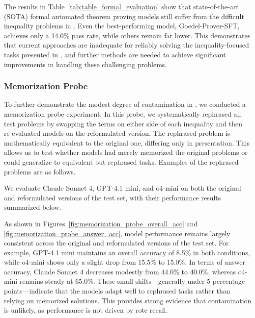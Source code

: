 

The results in Table~\ref{tab:table_formal_evaluation} show that state-of-the-art (SOTA) formal automated theorem proving models still suffer from the difficult inequality problems in \dataset. Even the best-performing model, Goedel-Prover-SFT, achieves only a 14.0\% pass rate, while others remain far lower. This demonstrates that current approaches are inadequate for reliably solving the inequality-focused tasks presented in \dataset, and further methods are needed to achieve significant improvements in handling these challenging problems. 

\subsubsection{Memorization Probe}
\label{app:memorization_probe}

To further demonstrate the modest degree of contamination in \dataset, we conducted a memorization probe experiment. In this probe, we systematically rephrased all test problems by swapping the terms on either side of each inequality and then re-evaluated models on the reformulated version. The rephrased problem is mathematically equivalent to the original one, differing only in presentation. This allows us to test whether models had merely memorized the original problems or could generalize to equivalent but rephrased tasks. Examples of the rephrased problems are as follows.




We evaluate Claude Sonnet 4, GPT-4.1 mini, and o4-mini on both the original and reformulated versions of the \dataset test set, with their performance results summarized below.

As shown in Figures~\ref{fig:memorization_probe_overall_acc} and \ref{fig:memorization_probe_answer_acc}, model performance remains largely consistent across the original and reformulated versions of the \dataset test set. For example, GPT-4.1 mini maintains an overall accuracy of 8.5\% in both conditions, while o4-mini shows only a slight drop from 15.5\% to 15.0\%. In terms of answer accuracy, Claude Sonnet 4 decreases modestly from 44.0\% to 40.0\%, whereas o4-mini remains steady at 65.0\%. These small shifts—generally under 5 percentage points—indicate that the models adapt well to rephrased tasks rather than relying on memorized solutions. This provides strong evidence that contamination is unlikely, as performance is not driven by rote recall.

